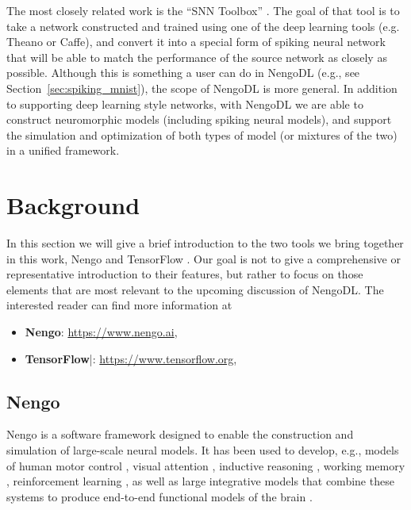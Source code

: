 \documentclass{article}
\begin{document}
The most closely related work is the ``SNN Toolbox'' \citep{Rueckauer2017}.  The goal of that tool is to take a network constructed and trained using one of the deep learning tools (e.g. Theano or Caffe), and convert it into a special form of spiking neural network that will be able to match the performance of the source network as closely as possible.  Although this is something a user can do in NengoDL (e.g., see Section~\ref{sec:spiking_mnist}), the scope of NengoDL is more general.  In addition to supporting deep learning style networks, with NengoDL we are able to construct neuromorphic models (including spiking neural models), and support the simulation and optimization of both types of model (or mixtures of the two) in a unified framework.

\section{Background}
\label{sec:background}

In this section we will give a brief introduction to the two tools we bring together in this work, Nengo \citep{Bekolay2014} and TensorFlow \citep{Abadi2016}.  Our goal is not to give a comprehensive or representative introduction to their features, but rather to focus on those elements that are most relevant to the upcoming discussion of NengoDL.  The interested reader can find more information at

\begin{itemize}
\item {\bf Nengo}: \url{https://www.nengo.ai}, \citet{Bekolay2014}
\item {\bf TensorFlow}|: \url{https://www.tensorflow.org}, \citet{Abadi2016}
\end{itemize}

\subsection{Nengo}

Nengo is a software framework designed to enable the construction and simulation of large-scale neural models.  It has been used to develop, e.g., models of human motor control \citep{DeWolf2016}, visual attention \citep{Bobier2014}, inductive reasoning \citep{Rasmussen2014}, working memory \citep{Choo2010}, reinforcement learning \citep{Stewart2012,Rasmussen2017}, as well as large integrative models that combine these systems to produce end-to-end functional models of the brain \citep{Eliasmith2012a}.
\end{document}
